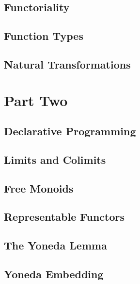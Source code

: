 \chapter{Functoriality}\label{functoriality}


\chapter{Function Types}\label{function-types}


\chapter{Natural Transformations}\label{chap-natural-transformations}


\part{Part Two}

\chapter{Declarative Programming}\label{declarative-programming}


\chapter{Limits and Colimits}\label{limits-and-colimits}


\chapter{Free Monoids}\label{chap-free-monoids}


\chapter{Representable Functors}\label{representable-functors}


\chapter{The Yoneda Lemma}\label{the-yoneda-lemma}


\chapter{Yoneda Embedding}\label{yoneda-embedding}



